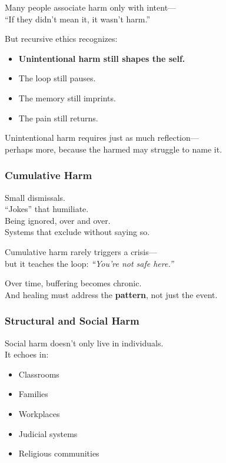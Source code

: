 Many people associate harm only with intent---\\
``If they didn't mean it, it wasn't harm.''

But recursive ethics recognizes:

\begin{itemize}
\item
  \textbf{Unintentional harm still shapes the self.\\
  }
\item
  The loop still pauses.
\item
  The memory still imprints.
\item
  The pain still returns.
\end{itemize}

Unintentional harm requires just as much reflection---\\
perhaps more, because the harmed may struggle to name it.

\subsubsection{\texorpdfstring{\textbf{Cumulative
Harm}}{Cumulative Harm}}\label{cumulative-harm-1}

Small dismissals.\\
``Jokes'' that humiliate.\\
Being ignored, over and over.\\
Systems that exclude without saying so.

Cumulative harm rarely triggers a crisis---\\
but it teaches the loop: \emph{``You're not safe here.''}

Over time, buffering becomes chronic.\\
And healing must address the \textbf{pattern}, not just the event.

\subsubsection{\texorpdfstring{\textbf{Structural and Social
Harm}}{Structural and Social Harm}}\label{structural-and-social-harm-1}

Social harm doesn't only live in individuals.\\
It echoes in:

\begin{itemize}
\item
  Classrooms
\item
  Families
\item
  Workplaces
\item
  Judicial systems
\item
  Religious communities
\end{itemize}

